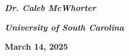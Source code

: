 \documentclass[11pt]{beamer}	%
\begin{document}
{\begin{frame}[plain]
\begin{center}
	{\bfseries\large\color{egold}\textit{Dr. Caleb McWhorter} \par
	\bfseries\textit{University of South Carolina}} \par\vspace{0cm}
\end{center} 

\begin{center}
	{\bfseries\small\color{Topazolite} March 14, 2025}
	\end{center} 
\end{frame}
}



















\end{document}

